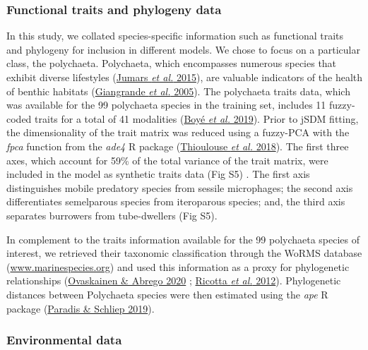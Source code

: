 \documentclass[9pt,biorxiv,doublespacing,lineno,endfloat]{lapreprint}
\begin{document}
\hypertarget{functional-traits-and-phylogeny-data}{%
\subsubsection{Functional traits and phylogeny
data}\label{functional-traits-and-phylogeny-data}}

In this study, we collated species-specific information such as
functional traits and phylogeny for inclusion in different models. We
chose to focus on a particular class, the polychaeta. Polychaeta, which
encompasses numerous species that exhibit diverse lifestyles
(\protect\hyperlink{ref-Jumars_2015}{Jumars \emph{et al.} 2015}), are
valuable indicators of the health of benthic habitats
(\protect\hyperlink{ref-Giangrande_2005}{Giangrande \emph{et al.}
2005}). The polychaeta traits data, which was available for the 99
polychaeta species in the training set, includes 11 fuzzy-coded traits
for a total of 41 modalities (\protect\hyperlink{ref-Boye_2019a}{Boyé
\emph{et al.} 2019}). Prior to jSDM fitting, the dimensionality of the
trait matrix was reduced using a fuzzy-PCA with the \emph{fpca} function
from the \emph{ade4} R package
(\protect\hyperlink{ref-Thioulouse_2018}{Thioulouse \emph{et al.}
2018}). The first three axes, which account for 59\% of the total
variance of the trait matrix, were included in the model as synthetic
traits data (Fig S5) . The first axis distinguishes mobile predatory
species from sessile microphages; the second axis differentiates
semelparous species from iteroparous species; and, the third axis
separates burrowers from tube-dwellers (Fig S5).

In complement to the traits information available for the 99 polychaeta
species of interest, we retrieved their taxonomic classification through
the WoRMS database
(\href{https://www.marinespecies.org}{www.marinespecies.org}) and used
this information as a proxy for phylogenetic relationships
(\protect\hyperlink{ref-Ovaskainen_2020}{Ovaskainen \& Abrego 2020} ;
\protect\hyperlink{ref-Ricotta_2012}{Ricotta \emph{et al.} 2012}).
Phylogenetic distances between Polychaeta species were then estimated
using the \emph{ape} R package
(\protect\hyperlink{ref-Paradis_2019}{Paradis \& Schliep 2019}).

\hypertarget{environmental-data}{%
\subsubsection{Environmental data}\label{environmental-data}}
\end{document}
